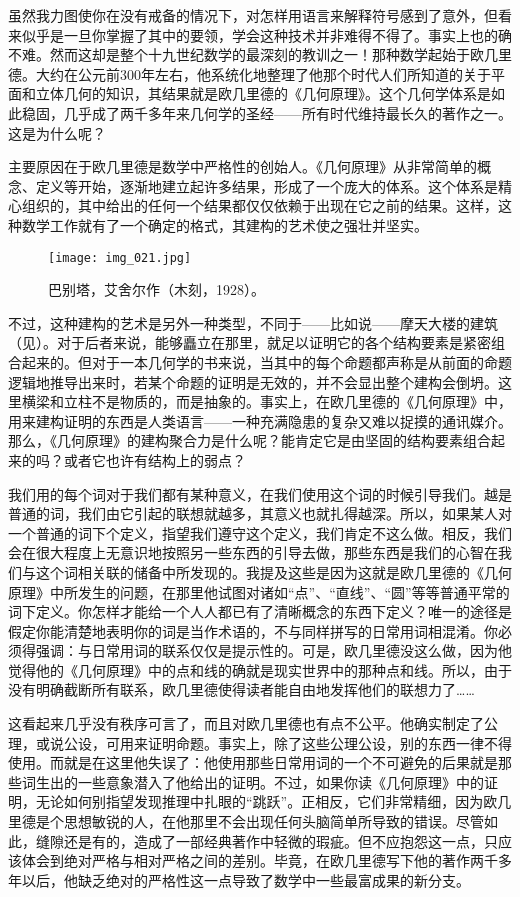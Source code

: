 虽然我力图使你在没有戒备的情况下，对怎样用语言来解释符号感到了意外，但看来似乎是一旦你掌握了其中的要领，学会这种技术并非难得不得了。事实上也的确不难。然而这却是整个十九世纪数学的最深刻的教训之一！那种数学起始于欧几里德。大约在公元前300年左右，他系统化地整理了他那个时代人们所知道的关于平面和立体几何的知识，其结果就是欧几里德的《几何原理》。这个几何学体系是如此稳固，几乎成了两千多年来几何学的圣经——所有时代维持最长久的著作之一。这是为什么呢？

主要原因在于欧几里德是数学中严格性的创始人。《几何原理》从非常简单的概念、定义等开始，逐渐地建立起许多结果，形成了一个庞大的体系。这个体系是精心组织的，其中给出的任何一个结果都仅仅依赖于出现在它之前的结果。这样，这种数学工作就有了一个确定的格式，其建构的艺术使之强壮并坚实。

\begin{figure}
\texttt{[image: img\_021.jpg]}
\caption[巴别塔，艾舍尔作。]
  {巴别塔，艾舍尔作（木刻，1928）。}
\end{figure}

不过，这种建构的艺术是另外一种类型，不同于——比如说——摩天大楼的建筑（见）。对于后者来说，能够矗立在那里，就足以证明它的各个结构要素是紧密组合起来的。但对于一本几何学的书来说，当其中的每个命题都声称是从前面的命题逻辑地推导出来时，若某个命题的证明是无效的，并不会显出整个建构会倒坍。这里横梁和立柱不是物质的，而是抽象的。事实上，在欧几里德的《几何原理》中，用来建构证明的东西是人类语言——一种充满隐患的复杂又难以捉摸的通讯媒介。那么，《几何原理》的建构聚合力是什么呢？能肯定它是由坚固的结构要素组合起来的吗？或者它也许有结构上的弱点？

我们用的每个词对于我们都有某种意义，在我们使用这个词的时候引导我们。越是普通的词，我们由它引起的联想就越多，其意义也就扎得越深。所以，如果某人对一个普通的词下个定义，指望我们遵守这个定义，我们肯定不这么做。相反，我们会在很大程度上无意识地按照另一些东西的引导去做，那些东西是我们的心智在我们与这个词相关联的储备中所发现的。我提及这些是因为这就是欧几里德的《几何原理》中所发生的问题，在那里他试图对诸如“点”、“直线”、“圆”等等普通平常的词下定义。你怎样才能给一个人人都已有了清晰概念的东西下定义？唯一的途径是假定你能清楚地表明你的词是当作术语的，不与同样拼写的日常用词相混淆。你必须得强调：与日常用词的联系仅仅是提示性的。可是，欧几里德没这么做，因为他觉得他的《几何原理》中的点和线的确就是现实世界中的那种点和线。所以，由于没有明确截断所有联系，欧几里德使得读者能自由地发挥他们的联想力了……

这看起来几乎没有秩序可言了，而且对欧几里德也有点不公平。他确实制定了公理，或说公设，可用来证明命题。事实上，除了这些公理公设，别的东西一律不得使用。而就是在这里他失误了：他使用那些日常用词的一个不可避免的后果就是那些词生出的一些意象潜入了他给出的证明。不过，如果你读《几何原理》中的证明，无论如何别指望发现推理中扎眼的“跳跃”。正相反，它们非常精细，因为欧几里德是个思想敏锐的人，在他那里不会出现任何头脑简单所导致的错误。尽管如此，缝隙还是有的，造成了一部经典著作中轻微的瑕疵。但不应抱怨这一点，只应该体会到绝对严格与相对严格之间的差别。毕竟，在欧几里德写下他的著作两千多年以后，他缺乏绝对的严格性这一点导致了数学中一些最富成果的新分支。

